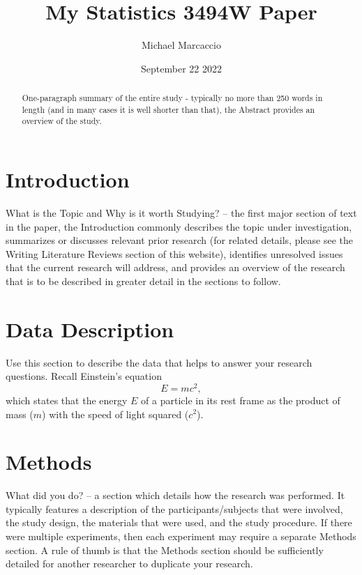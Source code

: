 \documentclass[12pt]{article}
\title{My Statistics 3494W Paper}
\author{Michael  Marcaccio}
\date{September 22 2022}
\begin{document}
\maketitle

\begin{abstract}
  One-paragraph summary of the entire study - typically no more than 250 words in length (and in many cases it is well shorter than that), the Abstract provides an overview of the study.
\end{abstract}

\section*{Introduction}
What is the Topic and Why is it worth Studying? – the first major section of text in the paper, the Introduction commonly describes the topic under investigation, summarizes or discusses relevant prior research (for related details, please see the Writing Literature Reviews section of this website), identifies unresolved issues that the current research will address, and provides an overview of the research that is to be described in greater detail in the sections to follow.

\section*{Data Description}
Use this section to describe the data that helps to answer your research
questions. Recall Einstein's equation
\begin{equation}
  \label{eq:mc2}
  E = m c^2,
\end{equation}
which states that the energy $E$ of a particle in its rest frame as the product
of mass ($m$) with the speed of light squared ($c^2$).

\section*{Methods}
What did you do? – a section which details how the research was performed.  It typically features a description of the participants/subjects that were involved, the study design, the materials that were used, and the study procedure.  If there were multiple experiments, then each experiment may require a separate Methods section.  A rule of thumb is that the Methods section should be sufficiently detailed for another researcher to duplicate your research.
\end{document}
